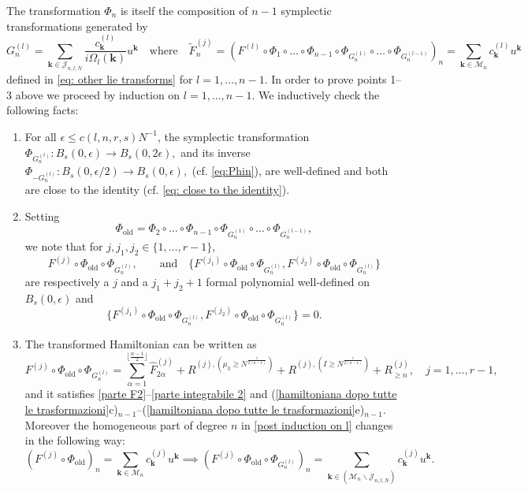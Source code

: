 \documentclass[a4paper,10pt,reqno]{article}
\theoremstyle{definition}
\theoremstyle{plain}
\theoremstyle{plain}
\theoremstyle{definition}
\theoremstyle{plain}
\theoremstyle{plain}
\theoremstyle{plain}
\theoremstyle{definition}
\theoremstyle{definition}
\def \M{\mathcal{M}}
\def \J{\mathcal{J}}
\def \k{\bm{k}}
\begin{document}
\smallskip

The transformation $\Phi_n$ is itself the composition of $n-1$ symplectic transformations generated by 
\begin{equation} \label{vera Gn}
G_n^{(l)} = \sum_{\k \in \J_{n,l,N}} \frac{c_{\k}^{(l)}}{i \Omega_l(\k)} u^{\k} \quad \text{where} \quad \widetilde{F}_n^{(j)} = \left ( F^{(l)} \circ \Phi_1 \circ \ldots \circ \Phi_{n-1} \circ \Phi_{G_n^{(1)}} \circ \ldots \circ \Phi_{G_n^{(l-1)}} \right )_n = \sum_{\k \in \M_n} c_{\k}^{(l)} u^{\k}
\end{equation}
defined in \eqref{eq: other lie transforms} for $l = 1,\ldots,n-1$.
In order to prove points 1--3 above we proceed by induction on $l=1,\ldots,n-1$.
We inductively check the following facts:
\begin{enumerate}
    \item[(i)] For all $\epsilon \le c(l,n,r,s)N^{-1}$, the symplectic transformation 
    $\Phi_{G_n^{(l)}} : B_s(0,\epsilon) \rightarrow B_s(0,2\epsilon),$
    and its inverse 
    $
    \Phi_{-G_n^{(l)}} : B_s(0,\epsilon/2) \rightarrow B_s(0,\epsilon),
    $
    (cf. \eqref{eq:Phin}), are well-defined and both are close to the identity (cf. \eqref{eq: close to the identity}).
    \item[(ii)] Setting
    \[
    \Phi_{\mathrm{old}} = \Phi_2 \circ \ldots \circ \Phi_{n-1} \circ \Phi_{G_n^{(1)}} \circ \ldots \circ \Phi_{G_n^{(l-1)}},
    \]
    we note that for $j,j_1,j_2 \in \{ 1,\ldots,r-1 \},$
    \[
    F^{(j)} \circ \Phi_{\mathrm{old}} \circ \Phi_{G_n^{(l)}}, \qquad \text{and} \quad \{ F^{(j_1)} \circ \Phi_{\mathrm{old}} \circ \Phi_{G_n^{(l)}} , F^{(j_2)} \circ \Phi_{\mathrm{old}} \circ \Phi_{G_n^{(l)}} \}
    \]
    are respectively a $j$ and a $j_1+j_2+1$ formal polynomial well-defined on $B_s(0,\epsilon)$ and
    \[
    \{ F^{(j_1)} \circ \Phi_{\mathrm{old}} \circ \Phi_{G_n^{(l)}} , F^{(j_2)} \circ \Phi_{\mathrm{old}} \circ \Phi_{G_n^{(l)}} \} = 0.
    \]
    \item[(iii)] The transformed Hamiltonian can be written as
\begin{equation}\label{post induction on l}
F^{(j)} \circ \Phi_{\mathrm{old}} \circ \Phi_{G_n^{(l)}} = \sum_{\alpha = 1}^{\lfloor \frac{n-1}{2} \rfloor } \widehat{F}_{2\alpha}^{(j)} + R^{(j),(\mu_3 \ge N^{\frac{1}{2(n-1)}})} + R^{(j),(I \ge N^{\frac{1}{2(n-1)}})} + R_{\ge n}^{(j)} ,\quad j=1,\ldots, r-1,
\end{equation}
and it satisfies \ref{parte F2}--\ref{parte integrabile 2} and (\ref{hamiltoniana dopo tutte le trasformazioni}c)$_{n-1}$--(\ref{hamiltoniana dopo tutte le trasformazioni}e)$_{n-1}$.
Moreover the homogeneous part of degree $n$ in \eqref{post induction on l} changes in the following way:
\[
(F^{(j)} \circ \Phi_{\mathrm{old}})_n = \sum_{\k \in \M_n} c_{\k}^{(j)} u^{\k} \implies \left ( F^{(j)} \circ \Phi_{\mathrm{old}} \circ \Phi_{G_n^{(l)}} \right )_n = \sum_{\k \in \left ( \M_n \smallsetminus \mathcal{J}_{n,l,N} \right )} c_{\k}^{(j)} u^{\k}.
\]
\end{enumerate}
\end{document}
